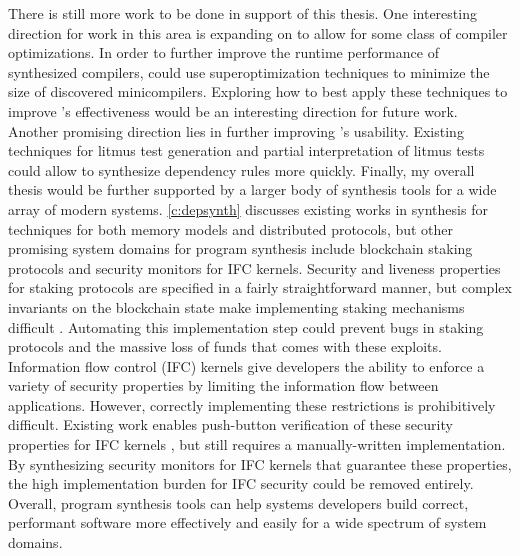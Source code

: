 There is still more work to be done in support of this thesis.
One interesting direction for work in this area is expanding on \jitsynth
to allow for some class of compiler optimizations.
In order to further improve the runtime performance of synthesized compilers,
\jitsynth could use superoptimization techniques to minimize the size
of discovered minicompilers.
Exploring how to best apply these techniques to improve \jitsynth's effectiveness
would be an interesting direction for future work.
Another promising direction lies in further improving \depsynth's usability.
Existing techniques for litmus test generation and partial interpretation of litmus tests
\cite{mohan:crashmonkey,bornholt:memsynth}
could allow \depsynth to synthesize dependency rules more quickly.
Finally, my overall thesis would be further supported by a larger
body of synthesis tools for a wide array of modern systems.
\cref{c:depsynth} discusses existing works in synthesis for
techniques for both memory models and distributed protocols,
but other promising system domains for program synthesis %
include blockchain staking protocols and security monitors for IFC kernels.
Security and liveness properties for staking protocols are specified in a fairly straightforward manner,
but complex invariants on the blockchain state make implementing staking mechanisms difficult
\cite{fahad:pos,wenting:secure-pos,aggelos:verified-pos}.
Automating this implementation step could prevent bugs in staking protocols
and the massive loss of funds that comes with these exploits.
Information flow control (IFC) kernels give developers the ability to enforce
a variety of security properties by limiting the information flow between applications.
However, correctly implementing these restrictions is prohibitively difficult.
Existing work enables push-button verification of these security properties for IFC kernels \cite{sigurbjarnarson:nickel},
but still requires a manually-written implementation.
By synthesizing security monitors for IFC kernels that guarantee these properties,
the high implementation burden for IFC security could be removed entirely.
Overall, program synthesis tools can help systems developers build correct, performant software
more effectively and easily for a wide spectrum of system domains.

